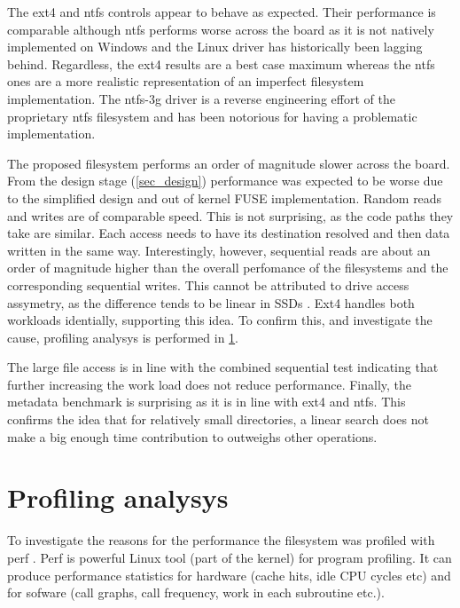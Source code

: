        The ext4 and ntfs controls appear to behave as expected. Their
        performance is comparable although ntfs performs worse across the board
        as it is not natively implemented on Windows and the Linux driver has
        historically been lagging behind. Regardless, the ext4 results are a
        best case maximum whereas the ntfs ones are a more realistic
        representation of an imperfect filesystem implementation. The ntfs-3g
        driver is a reverse engineering effort of the proprietary ntfs
        filesystem and has been notorious for having a problematic
        implementation.

        The proposed filesystem performs an order of magnitude slower across
        the board. From the design stage (\ref{sec_design}) performance was
        expected to be worse due to the simplified design and out of kernel
        FUSE implementation. Random reads and writes are of comparable speed.
        This is not surprising, as the code paths they take are similar. Each
        access needs to have its destination resolved and then data written in
        the same way. Interestingly, however, sequential reads are about an
        order of magnitude higher than the overall perfomance of the
        filesystems and the corresponding sequential writes. This cannot be
        attributed to drive access assymetry, as the difference tends to be
        linear in SSDs \cite{servethehome_review}. Ext4 handles both workloads
        identially, supporting this idea. To confirm this, and investigate the
        cause, profiling analysys is performed in \ref{sec_perf}.

        The large file access is in line with the combined sequential test
        indicating that further increasing the work load does not reduce
        performance. Finally, the metadata benchmark is surprising as it is in
        line with ext4 and ntfs. This confirms the idea that for relatively
        small directories, a linear search does not make a big enough time
        contribution to outweighs other operations.

    \section{Profiling analysys}
        \label{sec_perf}

        To investigate the reasons for the performance the filesystem was
        profiled with perf \cite{perf}. Perf is powerful Linux tool (part of
        the kernel) for program profiling. It can produce performance
        statistics for hardware (cache hits, idle CPU cycles etc) and for
        sofware (call graphs, call frequency, work in each subroutine etc.).

